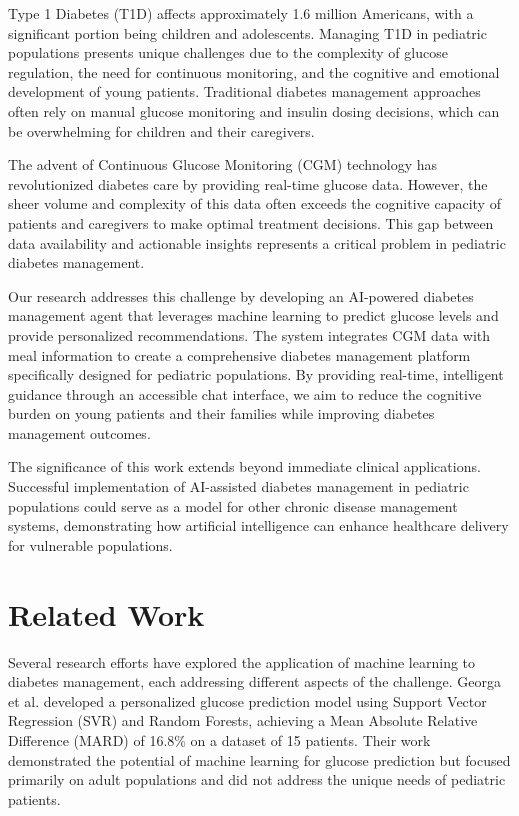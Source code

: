\documentclass[acmsmall]{acmart}
\begin{document}
Type 1 Diabetes (T1D) affects approximately 1.6 million Americans, with a significant portion being children and adolescents. Managing T1D in pediatric populations presents unique challenges due to the complexity of glucose regulation, the need for continuous monitoring, and the cognitive and emotional development of young patients. Traditional diabetes management approaches often rely on manual glucose monitoring and insulin dosing decisions, which can be overwhelming for children and their caregivers.

The advent of Continuous Glucose Monitoring (CGM) technology has revolutionized diabetes care by providing real-time glucose data. However, the sheer volume and complexity of this data often exceeds the cognitive capacity of patients and caregivers to make optimal treatment decisions. This gap between data availability and actionable insights represents a critical problem in pediatric diabetes management.

Our research addresses this challenge by developing an AI-powered diabetes management agent that leverages machine learning to predict glucose levels and provide personalized recommendations. The system integrates CGM data with meal information to create a comprehensive diabetes management platform specifically designed for pediatric populations. By providing real-time, intelligent guidance through an accessible chat interface, we aim to reduce the cognitive burden on young patients and their families while improving diabetes management outcomes.

The significance of this work extends beyond immediate clinical applications. Successful implementation of AI-assisted diabetes management in pediatric populations could serve as a model for other chronic disease management systems, demonstrating how artificial intelligence can enhance healthcare delivery for vulnerable populations.

\section{Related Work}

Several research efforts have explored the application of machine learning to diabetes management, each addressing different aspects of the challenge. Georga et al. \cite{Georga2013} developed a personalized glucose prediction model using Support Vector Regression (SVR) and Random Forests, achieving a Mean Absolute Relative Difference (MARD) of 16.8\% on a dataset of 15 patients. Their work demonstrated the potential of machine learning for glucose prediction but focused primarily on adult populations and did not address the unique needs of pediatric patients.
\end{document}
